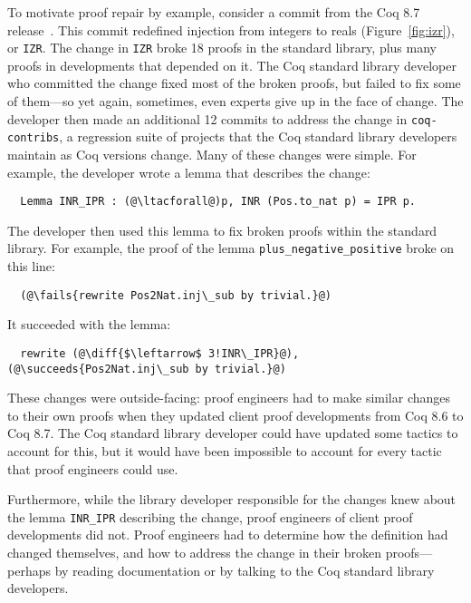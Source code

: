 To motivate proof repair by example, consider a commit from the Coq 8.7 release~\cite{coq87commit}.
This commit redefined injection from integers to reals (Figure~\ref{fig:izr}), or \lstinline{IZR}.
The change in \lstinline{IZR} broke 18 proofs in the standard library, plus many proofs in developments
that depended on it.
The Coq standard library developer who committed the change fixed most of the broken proofs,
but failed to fix some of them---so yet again, sometimes, even experts give up in the face of change. %
The developer then made an additional 12 commits to address the change in \lstinline{coq-contribs},
a regression suite of projects that the Coq standard library developers maintain as Coq versions change.
Many of these changes were simple. For example, the developer wrote a lemma that describes the change:

\lstset{language=coq, aboveskip=3pt, belowskip=3pt}
\begin{lstlisting}
  Lemma INR_IPR : (@\ltacforall@)p, INR (Pos.to_nat p) = IPR p.
\end{lstlisting}
The developer then used this lemma to fix broken proofs within the standard library. 
For example, the proof of the lemma \lstinline{plus_negative_positive} broke on this line: %

\begin{lstlisting}
  (@\fails{rewrite Pos2Nat.inj\_sub by trivial.}@)
\end{lstlisting}
It succeeded with the lemma:

\begin{lstlisting}
  rewrite (@\diff{$\leftarrow$ 3!INR\_IPR}@), (@\succeeds{Pos2Nat.inj\_sub by trivial.}@)
\end{lstlisting}
These changes were outside-facing: proof engineers had to make similar changes to their own proofs when
they updated client proof developments from Coq 8.6 to Coq 8.7.
The Coq standard library developer could have updated some tactics to account for this, but it 
would have been impossible to account for every tactic that proof engineers could use.

Furthermore, while the library developer responsible for the changes knew about the lemma \lstinline{INR_IPR}
describing the change, proof engineers of client proof developments did not. Proof engineers
had to determine how the definition had changed themselves, and how to address the change in their broken proofs---perhaps 
by reading documentation or by talking to the Coq standard library developers. 

